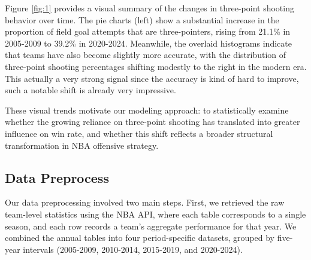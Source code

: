 \documentclass[11pt, a4paper]{article} %
\begin{document}


Figure \ref{fig:1} provides a visual summary of the changes in three-point shooting behavior over time. The pie charts (left) show a 
substantial increase in the proportion of field goal attempts that are three-pointers, rising from 21.1\% in 2005-2009 to 39.2\% 
in 2020-2024. Meanwhile, the overlaid histograms indicate that teams have also become slightly more accurate, 
with the distribution of three-point shooting percentages shifting modestly to the right in the modern era. This actually a very strong 
signal since the accuracy is kind of hard to improve, such a notable shift is already very impressive.

These visual trends motivate our modeling approach: to statistically examine whether the growing reliance on three-point shooting 
has translated into greater influence on win rate, and whether this shift reflects a broader structural transformation in NBA 
offensive strategy.


\subsection{Data Preprocess}
Our data preprocessing involved two main steps. First, we retrieved the raw team-level statistics using the NBA API, 
where each table corresponds to a single season, and each row records a team's aggregate performance for that year. 
We combined the annual tables into four period-specific datasets, grouped by five-year intervals (2005-2009, 2010-2014, 2015-2019, 
and 2020-2024).
\end{document}
